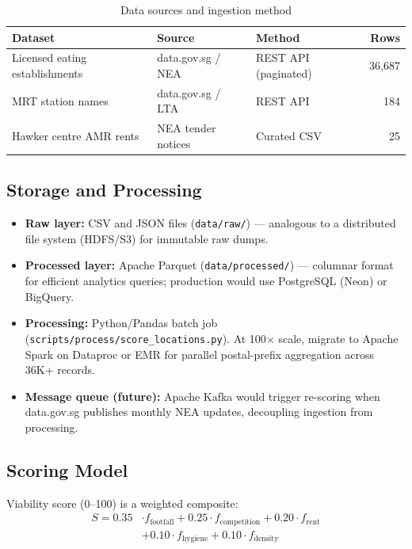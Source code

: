 \documentclass[11pt,a4paper]{article}
\begin{document}
\begin{table}[H]
\centering
\caption{Data sources and ingestion method}
\begin{tabular}{@{}lllr@{}}
\toprule
\textbf{Dataset} & \textbf{Source} & \textbf{Method} & \textbf{Rows} \\
\midrule
Licensed eating establishments & data.gov.sg / NEA & REST API (paginated) & 36,687 \\
MRT station names & data.gov.sg / LTA & REST API & 184 \\
Hawker centre AMR rents & NEA tender notices & Curated CSV & 25 \\
\bottomrule
\end{tabular}
\end{table}

\subsection{Storage and Processing}

\begin{itemize}
  \item \textbf{Raw layer:} CSV and JSON files (\texttt{data/raw/}) --- analogous to a distributed file system (HDFS/S3) for immutable raw dumps.
  \item \textbf{Processed layer:} Apache Parquet (\texttt{data/processed/}) --- columnar format for efficient analytics queries; production would use PostgreSQL (Neon) or BigQuery.
  \item \textbf{Processing:} Python/Pandas batch job (\texttt{scripts/process/score\_locations.py}). At 100$\times$ scale, migrate to Apache Spark on Dataproc or EMR for parallel postal-prefix aggregation across 36K+ records.
  \item \textbf{Message queue (future):} Apache Kafka would trigger re-scoring when data.gov.sg publishes monthly NEA updates, decoupling ingestion from processing.
\end{itemize}

\subsection{Scoring Model}

Viability score (0--100) is a weighted composite:
\begin{align*}
  S = 0.35 &\cdot f_{\text{footfall}} + 0.25 \cdot f_{\text{competition}} + 0.20 \cdot f_{\text{rent}} \\
           &+ 0.10 \cdot f_{\text{hygiene}} + 0.10 \cdot f_{\text{density}}
\end{align*}
\end{document}
